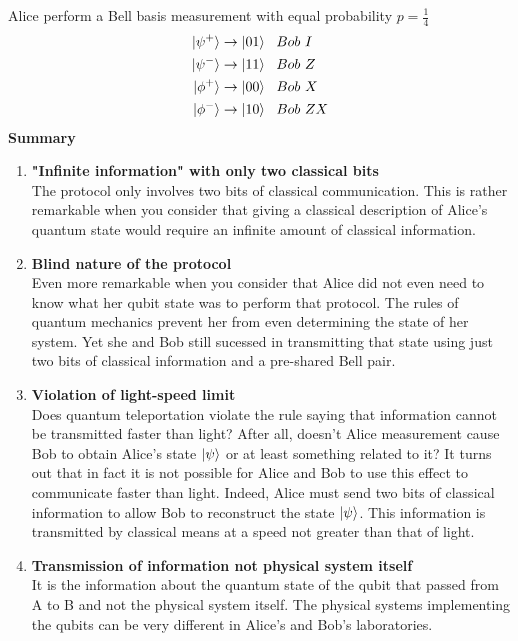 \documentclass[]{book}
\theoremstyle{nonumberplain}
\begin{document}
Alice perform a Bell basis measurement with equal probability $p=\frac{1}{4}$
\begin{equation*}
\begin{aligned}
	\ket{\psi^{+}} &\rightarrow \ket{01}\ \  Bob\ I \\ 
	\ket{\psi^{-}} &\rightarrow \ket{11} \ \  Bob\ Z \\
	\ket{\phi^{+}} &\rightarrow \ket{00} \ \  Bob\ X \\
	\ket{\phi^{-}} &\rightarrow \ket{10}  \ \  Bob\ ZX\\
\end{aligned}
\end{equation*}
\textbf{Summary}
\begin{enumerate}
	\item \textbf{"Infinite information" with only two classical bits \\}
			The protocol only involves two bits of classical communication. This is rather remarkable when you consider that giving a classical description of Alice's quantum state would require an infinite amount of classical information.
		\item \textbf{Blind nature of the protocol} \\
			Even more remarkable when you consider that Alice did not even need to know what her qubit state was to perform that protocol. The rules of quantum mechanics prevent her from even determining the state of her system. Yet she and Bob still sucessed in transmitting that state using just two bits of classical information and a pre-shared Bell pair.
		\item \textbf{Violation of light-speed limit} \\
			Does quantum teleportation violate the rule saying that information cannot be transmitted faster than light? After all, doesn't Alice measurement cause Bob to obtain Alice's state $\ket{\psi}$ or at least something related to it? It turns out that in fact it is not possible for Alice and Bob to use this effect to communicate faster than light. Indeed, Alice must send two bits of classical information to allow Bob to reconstruct the state $\ket{\psi}$. This information is transmitted by classical means at a speed not greater than that of light.
		\item \textbf{Transmission of information not physical system itself} \\
			It is the information about the quantum state of the qubit that passed from A to B and not the physical system itself. The physical systems implementing the qubits can be very different in Alice's and Bob's laboratories.

\end{enumerate}
\end{document}
